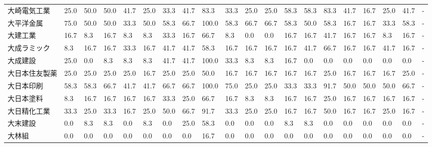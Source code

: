 \begin{tabular}{llllllllllllllllllll}
大崎電気工業          &   25.0 &   50.0 &      50.0 &      41.7 &       25.0 &   33.3 &   41.7 &   83.3 &    33.3 &    25.0 &   25.0 &  58.3 &   58.3 &    83.3 &    41.7 &  16.7 &  25.0 &  41.7 &     - \\
大平洋金属           &   75.0 &   50.0 &      50.0 &      33.3 &       50.0 &   58.3 &   66.7 &  100.0 &    58.3 &    66.7 &   66.7 &  58.3 &   50.0 &    58.3 &    16.7 &  16.7 &  33.3 &  58.3 &     - \\
大建工業            &   16.7 &    8.3 &      16.7 &       8.3 &        8.3 &   33.3 &   16.7 &   66.7 &     8.3 &     0.0 &    0.0 &  16.7 &   16.7 &    41.7 &    16.7 &  16.7 &   8.3 &  16.7 &     - \\
大成ラミック          &    8.3 &   16.7 &      16.7 &      33.3 &       16.7 &   41.7 &   41.7 &   58.3 &    16.7 &    16.7 &   16.7 &  16.7 &   41.7 &    66.7 &    16.7 &  16.7 &  41.7 &  16.7 &     - \\
大成建設            &   25.0 &    0.0 &       8.3 &       8.3 &        8.3 &   41.7 &   41.7 &  100.0 &    33.3 &     8.3 &    8.3 &  16.7 &    0.0 &     0.0 &     0.0 &   0.0 &   0.0 &   0.0 &     - \\
大日本住友製薬         &   25.0 &   25.0 &      25.0 &      25.0 &       16.7 &   25.0 &   25.0 &   50.0 &    16.7 &    16.7 &   16.7 &  16.7 &   16.7 &    25.0 &    16.7 &  16.7 &  16.7 &  25.0 &     - \\
大日本印刷           &   58.3 &   58.3 &      66.7 &      41.7 &       41.7 &   66.7 &   66.7 &  100.0 &    75.0 &    25.0 &   25.0 &  33.3 &   33.3 &    91.7 &    50.0 &  50.0 &  50.0 &  66.7 &     - \\
大日本塗料           &    8.3 &   16.7 &      16.7 &      16.7 &       16.7 &   33.3 &   25.0 &   66.7 &    16.7 &     8.3 &    8.3 &  16.7 &   16.7 &    25.0 &    16.7 &  16.7 &  16.7 &  16.7 &     - \\
大日精化工業          &   33.3 &   25.0 &      33.3 &      16.7 &       25.0 &   50.0 &   66.7 &   91.7 &    33.3 &    25.0 &   25.0 &  16.7 &   16.7 &    50.0 &    16.7 &  16.7 &  25.0 &  16.7 &     - \\
大末建設            &    0.0 &    8.3 &       8.3 &       0.0 &        8.3 &    0.0 &   25.0 &   58.3 &     0.0 &     0.0 &    0.0 &   8.3 &    8.3 &     0.0 &     0.0 &   0.0 &   0.0 &   0.0 &     - \\
大林組             &    0.0 &    0.0 &       0.0 &       0.0 &        0.0 &    0.0 &    0.0 &   16.7 &     0.0 &     0.0 &    0.0 &   0.0 &    0.0 &     0.0 &     0.0 &   0.0 &   0.0 &   0.0 &     - \\

\end{tabular}
